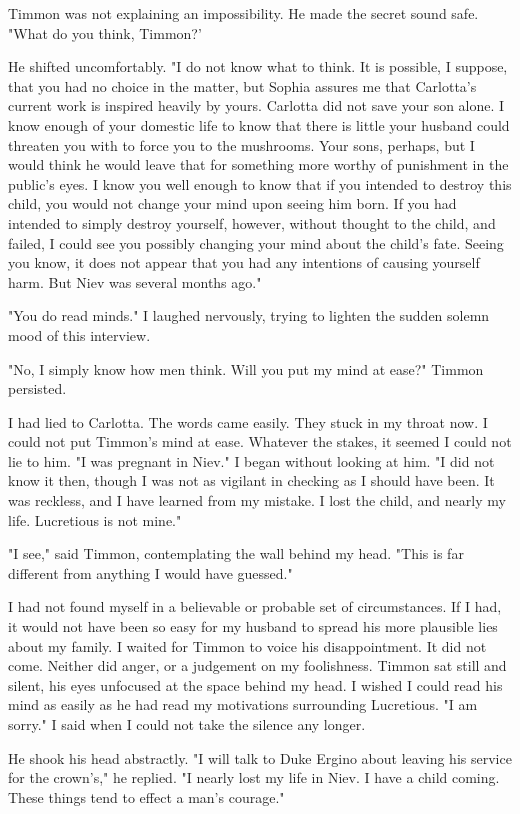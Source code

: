 \documentclass{article}
\begin{document}
Timmon was not explaining an impossibility. He made the secret sound safe. "What do you think, Timmon?'

He shifted uncomfortably. "I do not know what to think. It is possible, I suppose, that you had no choice in the matter, but Sophia assures me that Carlotta's current work is inspired heavily by yours. Carlotta did not save your son alone. I know enough of your domestic life to know that there is little your husband could threaten you with to force you to the mushrooms. Your sons, perhaps, but I would think he would leave that for something more worthy of punishment in the public's eyes. I know you well enough to know that if you intended to destroy this child, you would not change your mind upon seeing him born. If you had intended to simply destroy yourself, however, without thought to the child, and failed, I could see you possibly changing your mind about the child's fate. Seeing you know, it does not appear that you had any intentions of causing yourself harm. But Niev was several months ago."

"You do read minds." I laughed nervously, trying to lighten the sudden solemn mood of this interview.

"No, I simply know how men think. Will you put my mind at ease?" Timmon persisted.

I had lied to Carlotta. The words came easily. They stuck in my throat now. I could not put Timmon's mind at ease. Whatever the stakes, it seemed I could not lie to him. "I was pregnant in Niev." I began without looking at him. "I did not know it then, though I was not as vigilant in checking as I should have been. It was reckless, and I have learned from my mistake. I lost the child, and nearly my life. Lucretious is not mine."

"I see," said Timmon, contemplating the wall behind my head. "This is far different from anything I would have guessed."

I had not found myself in a believable or probable set of circumstances. If I had, it would not have been so easy for my husband to spread his more plausible lies about my family. I waited for Timmon to voice his disappointment. It did not come. Neither did anger, or a judgement on my foolishness. Timmon sat still and silent, his eyes unfocused at the space behind my head. I wished I could read his mind as easily as he had read my motivations surrounding Lucretious. "I am sorry." I said when I could not take the silence any longer.

He shook his head abstractly. "I will talk to Duke Ergino about leaving his service for the crown's," he replied. "I nearly lost my life in Niev. I have a child coming. These things tend to effect a man's courage."
\end{document}
